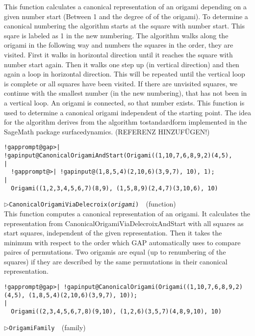 \documentclass[a4paper,11pt]{report}
\begin{document}
{{{ This function calculates a canonical representation of an origami depending on
a given number start (Between 1 and the degree of of the origami). To
determine a canonical numbering the algorithm starts at the square with number
start. This sqare is labeled as 1 in the new numbering. The algorithm walks
along the origami in the following way and numbers the squares in the order,
they are visited. First it walks in horizontal direction until it reaches the
square with number start again. Then it walks one step up (in vertical
direction) and then again a loop in horizontal direction. This will be
repeated until the vertical loop is complete or all squares have been visited.
If there are unvisited squares, we continue with the smallest number (in the
new numbering), that has not been in a vertical loop. An origami is connected,
so that number exists. This function is used to determine a canonical origami
independent of the starting point. The idea for the algorithm derives from the
algorithm to{\textunderscore}standard{\textunderscore}form implemented in the
SageMath package surface{\textunderscore}dynamics. (REFERENZ HINZUF{\"U}GEN!) 
\begin{Verbatim}[commandchars=!@|,fontsize=\small,frame=single,label=Example]
  !gapprompt@gap>| !gapinput@CanonicalOrigamiAndStart(Origami((1,10,7,6,8,9,2)(4,5),
|
  !gapprompt@>| !gapinput@(1,8,5,4)(2,10,6)(3,9,7), 10), 1);
|
  Origami((1,2,3,4,5,6,7)(8,9), (1,5,8,9)(2,4,7)(3,10,6), 10)
\end{Verbatim}
 \noindent\textcolor{FuncColor}{$\triangleright$\enspace\texttt{CanonicalOrigamiViaDelecroix({\mdseries\slshape origami})
\label{CanonicalOrigamiViaDelecroix}
}\hfill{\scriptsize (function)}}\\


 This function computes a canonical representation of an origami. It calculates
the representation from CanonicalOrigamiViaDelecroixAndStart with all squares
as start squares, independent of the given representation. Then it takes the
minimum with respect to the order which \textsf{GAP} automatically uses to compare paires of permutations. Two origamis are equal
(up to renumbering of the squares) if they are described by the same
permutations in their canonical representation. 
\begin{Verbatim}[commandchars=!@|,fontsize=\small,frame=single,label=Example]
  !gapprompt@gap>| !gapinput@CanonicalOrigami(Origami((1,10,7,6,8,9,2)(4,5), (1,8,5,4)(2,10,6)(3,9,7), 10));
|
  Origami((2,3,4,5,6,7,8)(9,10), (1,2,6)(3,5,7)(4,8,9,10), 10)
\end{Verbatim}
 \noindent\textcolor{FuncColor}{$\triangleright$\enspace\texttt{OrigamiFamily
\label{OrigamiFamily}
}\hfill{\scriptsize (family)}}\\


}}}
\end{document}
